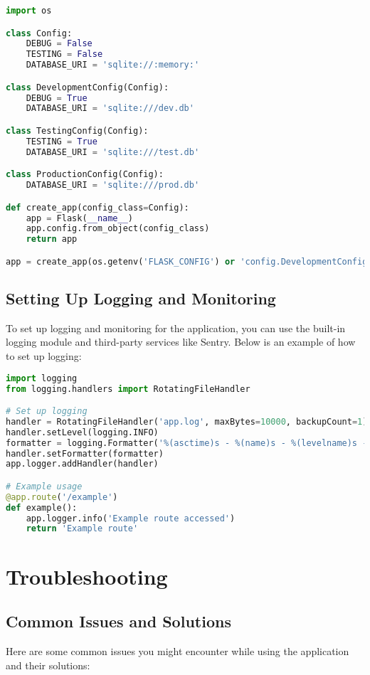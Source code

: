 \documentclass[a4paper]{article}
\begin{document}
\begin{lstlisting}[language=python]
import os

class Config:
    DEBUG = False
    TESTING = False
    DATABASE_URI = 'sqlite://:memory:'

class DevelopmentConfig(Config):
    DEBUG = True
    DATABASE_URI = 'sqlite:///dev.db'

class TestingConfig(Config):
    TESTING = True
    DATABASE_URI = 'sqlite:///test.db'

class ProductionConfig(Config):
    DATABASE_URI = 'sqlite:///prod.db'

def create_app(config_class=Config):
    app = Flask(__name__)
    app.config.from_object(config_class)
    return app

app = create_app(os.getenv('FLASK_CONFIG') or 'config.DevelopmentConfig')
\end{lstlisting}

\subsection{Setting Up Logging and Monitoring}
To set up logging and monitoring for the application, you can use the built-in logging module and third-party services like Sentry. Below is an example of how to set up logging:

\begin{lstlisting}[language=python]
import logging
from logging.handlers import RotatingFileHandler

# Set up logging
handler = RotatingFileHandler('app.log', maxBytes=10000, backupCount=1)
handler.setLevel(logging.INFO)
formatter = logging.Formatter('%(asctime)s - %(name)s - %(levelname)s - %(message)s')
handler.setFormatter(formatter)
app.logger.addHandler(handler)

# Example usage
@app.route('/example')
def example():
    app.logger.info('Example route accessed')
    return 'Example route'
\end{lstlisting}

\section{Troubleshooting}
\subsection{Common Issues and Solutions}
Here are some common issues you might encounter while using the application and their solutions:
\end{document}
